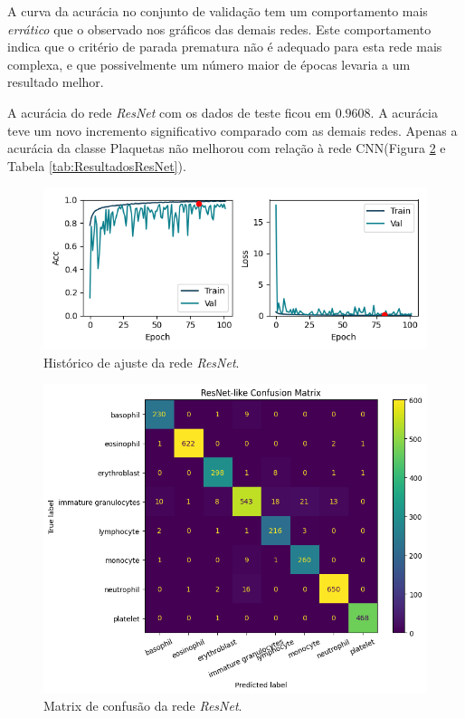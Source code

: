 \documentclass[final,5p]{elsarticle}
\numberwithin{equation}{section}
\begin{document}
    A curva da acurácia no conjunto de validação tem um comportamento mais \emph{errático} que o observado nos gráficos das demais redes. Este comportamento indica que o critério de parada prematura não é adequado para esta rede mais complexa, e que possivelmente um número maior de épocas levaria a um resultado melhor.

    A acurácia do rede \emph{ResNet} com os dados de teste ficou em $0.9608$. A acurácia teve um novo incremento significativo comparado com as demais redes. Apenas a acurácia da classe Plaquetas não melhorou com relação à rede CNN(Figura \ref{fig:MatrizConfusaoResNet} e Tabela \ref{tab:ResultadosResNet}).

    \begin{figure}[hbt!]
        \includegraphics[width=0.95\columnwidth]{ResNet_history_cropped.png}
        \caption{Histórico de ajuste da rede \emph{ResNet}.}\label{fig:HistoricoResNet}
    \end{figure}

    \begin{figure}[hbt!]
        \includegraphics[width=0.95\columnwidth]{ResNet_cm.png}
        \caption{Matrix de confusão da rede \emph{ResNet}.}\label{fig:MatrizConfusaoResNet}
    \end{figure}
\end{document}
